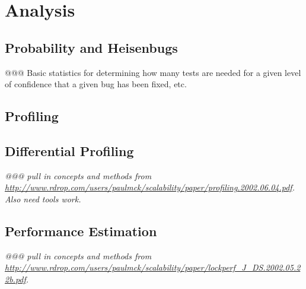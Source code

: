 
\chapter{Analysis}
\label{chp:Analysis}


\section{Probability and Heisenbugs}
\label{sec:analysis:Probability and Heisenbugs}

@@@ Basic statistics for determining how many tests are needed for a
given level of confidence that a given bug has been fixed, etc.

\section{Profiling}
\label{sec:analysis:Profiling}

\section{Differential Profiling}
\label{sec:analysis:Differential Profiling}

{\em @@@ pull in concepts and methods from
\url{http://www.rdrop.com/users/paulmck/scalability/paper/profiling.2002.06.04.pdf}.
Also need tools work.}



\section{Performance Estimation}
\label{sec:analysis:Performance Estimation}

{\em @@@ pull in concepts and methods from
\url{http://www.rdrop.com/users/paulmck/scalability/paper/lockperf_J_DS.2002.05.22b.pdf}.}
